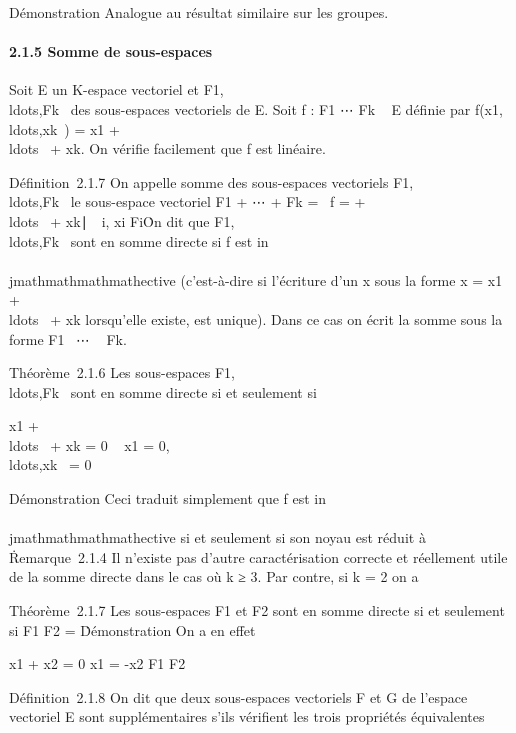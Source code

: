 Démonstration Analogue au résultat similaire sur les groupes.

\paragraph{2.1.5 Somme de sous-espaces}

Soit E un K-espace vectoriel et
F1,\\ldots,Fk~
des sous-espaces vectoriels de E. Soit f : F1
\times⋯ \times Fk \rightarrow~ E définie par
f(x1,\\ldots,xk~)
= x1 +
\\ldots~ +
xk. On vérifie facilement que f est linéaire.

Définition~2.1.7 On appelle somme des sous-espaces vectoriels
F1,\\ldots,Fk~
le sous-espace vectoriel F1 + ⋯ +
Fk = \mathrmIm~f =
 +
\\ldots~ +
xk∣\forall~~i,
xi \in Fi\. On dit que
F1,\\ldots,Fk~
sont en somme directe si f est in\\\\jmathmathmathmathective (c'est-à-dire si l'écriture
d'un x sous la forme x = x1 +
\\ldots~ +
xk lorsqu'elle existe, est unique). Dans ce cas on écrit la
somme sous la forme F1 \oplus~⋯ \oplus~
Fk.

Théorème~2.1.6 Les sous-espaces
F1,\\ldots,Fk~
sont en somme directe si et seulement si

x1 +
\\ldots~ +
xk = 0 \rigtharrow~ x1 =
0,\\ldots,xk~
= 0

Démonstration Ceci traduit simplement que f est in\\\\jmathmathmathmathective si et
seulement si son noyau est réduit à
\0\.

Remarque~2.1.4 Il n'existe pas d'autre caractérisation correcte et
réellement utile de la somme directe dans le cas où k ≥ 3. Par contre,
si k = 2 on a

Théorème~2.1.7 Les sous-espaces F1 et F2 sont en
somme directe si et seulement si F1 \bigcap F2 =
\0\.

Démonstration On a en effet

x1 + x2 = 0 \Leftrightarrow
x1 = -x2 \in F1 \bigcap F2

Définition~2.1.8 On dit que deux sous-espaces vectoriels F et G de
l'espace vectoriel E sont supplémentaires s'ils vérifient les trois
propriétés équivalentes

